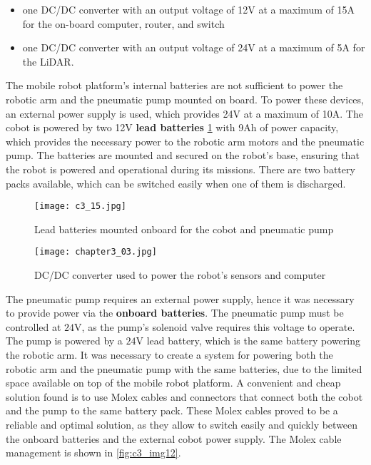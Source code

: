 \begin{itemize}
    \item one DC/DC converter with an output voltage of 12V at a maximum of 15A for the on-board computer, router, and switch
    \item one DC/DC converter with an output voltage of 24V at a maximum of 5A for the LiDAR.
\end{itemize}

The mobile robot platform's internal batteries are not sufficient to power the robotic arm and the pneumatic pump
mounted on board. To power these devices, an external power supply is used, which provides 24V at a maximum of 10A.
The cobot is powered by two 12V \textbf{lead batteries} \ref{fig:c3_img15} with 9Ah of power capacity, 
which provides the necessary power to the robotic arm motors and the pneumatic pump. 
The batteries are mounted and secured on the robot's base,
ensuring that the robot is powered and operational during its missions. There are two battery packs available,
which can be switched easily when one of them is discharged.

\begin{figure}[t]
    \centering
    \texttt{[image: c3\_15.jpg]}
    \captionsetup{width=1\linewidth}
    \caption{Lead batteries mounted onboard for the cobot and pneumatic pump}
    \label{fig:c3_img15}
\end{figure}

\begin{figure}[t]
    \centering
    \texttt{[image: chapter3\_03.jpg]}
    \captionsetup{width=1\linewidth}
    \caption{DC/DC converter used to power the robot's sensors and computer}
    \label{fig:c3_img03}
\end{figure}

The pneumatic pump requires an external power supply, hence it was necessary to provide power via
the \textbf{onboard batteries}.
The pneumatic pump must be controlled at $24$V, as the pump's solenoid valve requires this voltage to operate.
The pump is powered by a $24$V lead battery, which is the same battery powering
the robotic arm. It was necessary to create a system for powering both the robotic arm and the pneumatic pump
with the same batteries, due to the limited space available on top of the mobile robot platform.
A convenient and cheap solution found is to use Molex cables and connectors that connect both the cobot
and the pump to the same battery pack.
These Molex cables proved to be a reliable and optimal solution, as they allow to switch easily and quickly
between the onboard batteries and the external cobot power supply.
The Molex cable management is shown in \ref{fig:c3_img12}.


